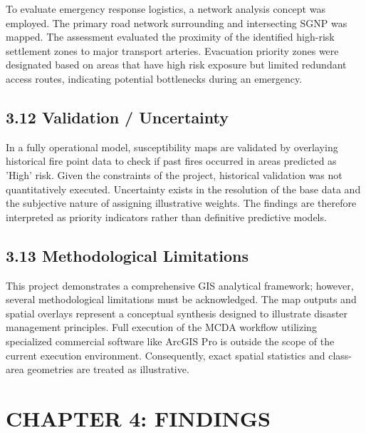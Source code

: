 \documentclass[12pt,a4paper]{article}
\begin{document}
To evaluate emergency response logistics, a network analysis concept was employed. The primary road network surrounding and intersecting SGNP was mapped. The assessment evaluated the proximity of the identified high-risk settlement zones to major transport arteries. Evacuation priority zones were designated based on areas that have high risk exposure but limited redundant access routes, indicating potential bottlenecks during an emergency.



\subsection*{3.12 Validation / Uncertainty}

In a fully operational model, susceptibility maps are validated by overlaying historical fire point data to check if past fires occurred in areas predicted as 'High' risk. Given the constraints of the project, historical validation was not quantitatively executed. Uncertainty exists in the resolution of the base data and the subjective nature of assigning illustrative weights. The findings are therefore interpreted as priority indicators rather than definitive predictive models.



\subsection*{3.13 Methodological Limitations}

This project demonstrates a comprehensive GIS analytical framework; however, several methodological limitations must be acknowledged. The map outputs and spatial overlays represent a conceptual synthesis designed to illustrate disaster management principles. Full execution of the MCDA workflow utilizing specialized commercial software like ArcGIS Pro is outside the scope of the current execution environment. Consequently, exact spatial statistics and class-area geometries are treated as illustrative.



\clearpage
\section*{CHAPTER 4: FINDINGS}
\end{document}
